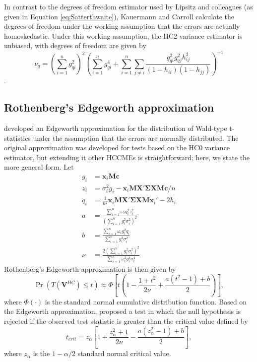 \documentclass[12pt]{article}\usepackage[]{graphicx}\usepackage[]{color}
\newcommand{\bm}{\mathbf}
\newcommand{\bs}{\boldsymbol}
\begin{document}
In contrast to the degrees of freedom estimator used by Lipsitz and colleagues (as given in Equation \ref{eq:Satterthwaite}), Kauermann and Carroll calculate the degrees of freedom under the working assumption that the errors are actually homoskedastic. Under this working assumption, the HC2 variance estimator is unbiased, with degrees of freedom are given by \[
\nu_q = \left(\sum_{i=1}^n g_{qi}^2\right)^2\left(\sum_{i=1}^n g_{qi}^4 + \sum_{i=1}^n \sum_{j \neq i} \frac{g_{qi}^2 g_{qj}^2 h_{ij}^2}{(1 - h_{ii})(1 - h_{jj})}\right)^{-1} \].

\subsection{Rothenberg's Edgeworth approximation}

\citet{Rothenberg1988approximate} developed an Edgeworth approximation for the distribution of Wald-type t-statistics under the assumption that the errors are normally distributed. The original approximation was developed for tests based on the HC0 variance estimator, but extending it other HCCMEs is straightforward; here, we state the more general form. 
Let
\begin{align*}
g_i &= \bm{x}_i\bm{M}\bm{c} \\
z_i &= \sigma_i^2 g_i - \bm{x}_i \bm{M}\bm{X}'\bs\Sigma \bm{X} \bm{M}\bm{c} / n \\ 
q_i &= \frac{1}{n^2} \bm{x}_i\bm{M}\bm{X}'\bs\Sigma \bm{X}\bm{M}\bm{x}_i'  - 2 h_i \\
a &= \frac{\sum_{i=1}^n \omega_i g_i^2 z_i^2}{\left(\sum_{i=1}^n g_i^2 \sigma_i^2\right)^2} \\
b &= \frac{\sum_{i=1}^n \omega_i g_i^2  q_i}{\sum_{i=1}^n g_i^2 \sigma_i^2} \\
\nu &= \frac{2\left(\sum_{i=1}^n g_i^2 \sigma_i^2\right)^2}{\sum_{i=1}^n \omega_i^2 g_i^4 \sigma_i^4}
\end{align*}
Rothenberg's Edgeworth approximation is then given by 
\[
\Pr\left(T(\bm{V}^{HC}) \leq t \right) \approx \Phi\left[t \left(1 - \frac{1 + t^2}{2\nu} + \frac{a\left(t^2 - 1\right) + b}{2}\right)\right], 
\]
where $\Phi(\cdot)$ is the standard normal cumulative distribution function.
Based on the Edgeworth approximation, \citet{Rothenberg1988approximate} proposed a test in which the null hypothesis is rejected if the observed test statistic is greater than the critical value defined by 
\begin{equation}
\label{eq:edge_Roth}
t_{crit} = z_{\alpha}\left[1 + \frac{z_{\alpha}^2 + 1}{2 \nu} - \frac{a\left(z_{\alpha}^2 - 1\right) + b}{2}\right],
\end{equation}
where $z_\alpha$ is the $1 - \alpha / 2$ standard normal critical value. 
\end{document}
